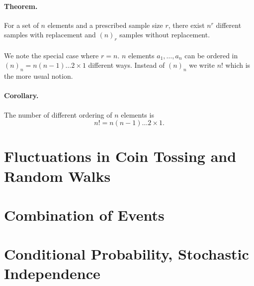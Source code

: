\documentclass{article}
\numberwithin{equation}{subsection}
\begin{document}
			\paragraph{Theorem. } For a set of $n$ elements and a prescribed sample size $r$, there exist $n^r$ different samples with replacement and $(n)_r$ samples without replacement.			
			\paragraph{} We note the special case where $r=n$. $n$ elements $a_1,\dots,a_n$ can be ordered in $(n)_n = n(n-1)\dots2\times1$ different ways. Instead of $(n)_n$ we write $n!$ which is the more usual notion.
			\paragraph{Corollary. } The number of different ordering of $n$ elements is
			\begin{equation}
				n! = n(n-1)\dots 2\times 1.
			\end{equation}
			\paragraph{} 
	\newpage
	\section{Fluctuations in Coin Tossing and Random Walks}
			
	\newpage
	\section{Combination of Events}
					
	\newpage
	\section{Conditional Probability, Stochastic Independence}
			
		
\end{document}
